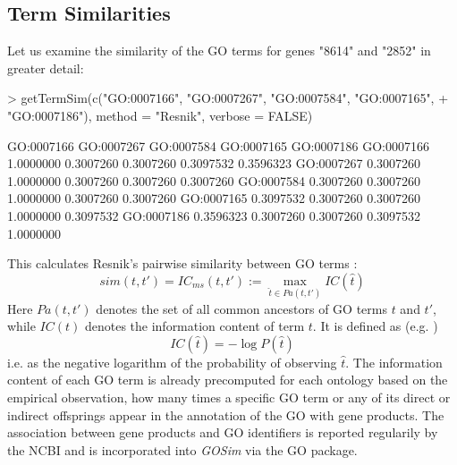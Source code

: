 \documentclass[12pt,a4paper]{article}
\begin{document}
\subsection{Term Similarities}

Let us examine the similarity of the GO terms for genes "8614" and "2852" in greater detail:
\begin{Schunk}
\begin{Sinput}
> getTermSim(c("GO:0007166", "GO:0007267", "GO:0007584", "GO:0007165", 
+     "GO:0007186"), method = "Resnik", verbose = FALSE)
\end{Sinput}
\begin{Soutput}
           GO:0007166 GO:0007267 GO:0007584 GO:0007165 GO:0007186
GO:0007166  1.0000000  0.3007260  0.3007260  0.3097532  0.3596323
GO:0007267  0.3007260  1.0000000  0.3007260  0.3007260  0.3007260
GO:0007584  0.3007260  0.3007260  1.0000000  0.3007260  0.3007260
GO:0007165  0.3097532  0.3007260  0.3007260  1.0000000  0.3097532
GO:0007186  0.3596323  0.3007260  0.3007260  0.3097532  1.0000000
\end{Soutput}
\end{Schunk}
This calculates Resnik's pairwise similarity between GO terms \cite{Resnik95,Resnik99}:
\begin{equation}
sim(t,t') = IC_{ms}(t,t') := \max_{\hat{t}\in Pa(t,t')} IC(\hat{t})\label{eq:Resnik}
\end{equation}
Here $Pa(t,t')$ denotes the set of all common ancestors of GO terms $t$ and $t'$, while $IC(t)$  denotes the information content of term $t$. It is defined as (e.g. \cite{Lord03})
\begin{equation}
IC(\hat{t}) = -\log P(\hat{t})
\end{equation}
i.e. as the negative logarithm of the probability of observing $\hat{t}$. The information content of each GO term is already precomputed for each ontology based on the empirical observation, how many times a specific GO term or any of its direct or indirect offsprings appear in the annotation of the GO with gene products. The association between gene products and GO identifiers is reported regularily by the NCBI and is incorporated into \emph{GOSim} via the GO package.
\end{document}
